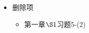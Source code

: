 \documentclass{article}
\begin{document}
\begin{itemize}
    \item 删除项
          \begin{itemize}
              \item 第一章$\S 1$习题5-(2)
          \end{itemize}
\end{itemize}
\end{document}
